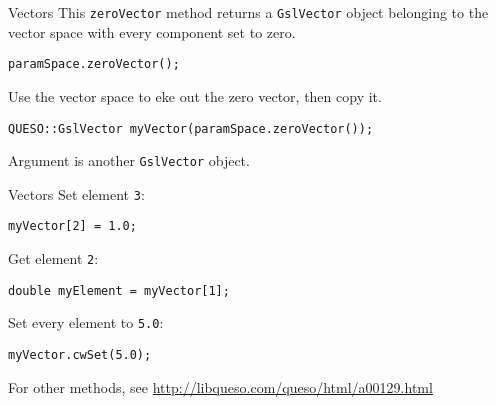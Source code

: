 \begin{frame}[fragile]{Vectors}
  This \texttt{zeroVector} method returns a \texttt{GslVector} object belonging
  to the vector space with every component set to zero.
  \begin{verbatim}
paramSpace.zeroVector();
  \end{verbatim}
  Use the vector space to eke out the zero vector, then copy it.
  \begin{verbatim}
QUESO::GslVector myVector(paramSpace.zeroVector());
  \end{verbatim}
  Argument is another \texttt{GslVector} object.
\end{frame}

\begin{frame}[fragile]{Vectors}
  Set element \texttt{3}:
  \begin{verbatim}
myVector[2] = 1.0;
  \end{verbatim}
  Get element \texttt{2}:
  \begin{verbatim}
double myElement = myVector[1];
  \end{verbatim}
  Set every element to \texttt{5.0}:
  \begin{verbatim}
myVector.cwSet(5.0);
  \end{verbatim}
  For other methods, see \url{http://libqueso.com/queso/html/a00129.html}
\end{frame}
